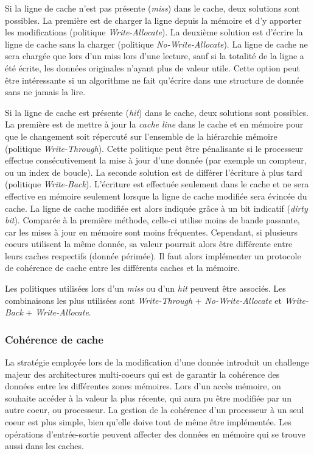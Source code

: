 Si la ligne de cache n'est pas présente (\textit{miss}) dans le cache, deux solutions sont possibles. La première est de charger la ligne depuis la mémoire et d'y apporter les modifications (politique \textit{Write-Allocate}). La deuxième solution est d'écrire la ligne de cache sans la charger (politique \textit{No-Write-Allocate}). La ligne de cache ne sera chargée que lors d'un miss lors d'une lecture, sauf si la totalité de la ligne a été écrite, les données originales n'ayant plus de valeur utile. Cette option peut être intéressante si un algorithme ne fait qu'écrire dans une structure de donnée sans ne jamais la lire.

Si la ligne de cache est présente (\textit{hit}) dans le cache, deux solutions sont possibles. La première est de mettre à jour la \textit{cache line} dans le cache et en mémoire pour que le changement soit répercuté sur l'ensemble de la hiérarchie mémoire (politique \textit{Write-Through}). Cette politique peut être pénalisante si le processeur effectue consécutivement la mise à jour d'une donnée (par exemple un compteur, ou un index de boucle).  La seconde solution est de différer l'écriture à plus tard (politique \textit{Write-Back}). L'écriture est effectuée seulement dans le cache et ne sera effective en mémoire seulement lorsque la ligne de cache modifiée sera évincée du cache. La ligne de cache modifiée est alors indiquée grâce à un bit indicatif (\textit{dirty bit}). Comparée à la première méthode, celle-ci utilise moins de bande passante, car les mises à jour en mémoire sont moins fréquentes. Cependant, si plusieurs coeurs utilisent la même donnée, sa valeur pourrait alors être différente entre leurs caches respectifs (donnée périmée). Il faut alors implémenter un protocole de cohérence de cache entre les différents caches et la mémoire.

Les politiques utilisées lors d'un \textit{miss} ou d'un \textit{hit} peuvent être associés. Les combinaisons les plus utilisées sont \textit{Write-Through} + \textit{No-Write-Allocate} et \textit{Write-Back} + \textit{Write-Allocate}.






\subsubsection{Cohérence de cache} \label{sec:cache_coherence}

La stratégie employée lors de la modification d'une donnée introduit un challenge majeur des architectures multi-coeurs qui est de garantir la cohérence des données entre les différentes zones mémoires. Lors d'un accès mémoire, on souhaite accéder à la valeur la plus récente, qui aura pu être modifiée par un autre coeur, ou processeur. La gestion de la cohérence d'un processeur à un seul coeur est plus simple, bien qu'elle doive tout de même être implémentée. Les opérations d'entrée-sortie peuvent affecter des données en mémoire qui se trouve aussi dans les caches.

